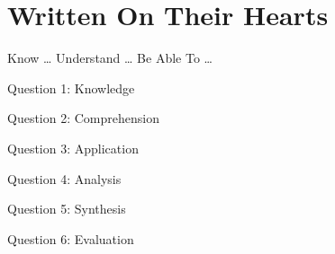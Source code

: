 \chapter{Written On Their Hearts}

\begin{goals}
\goal Know \ldots
\goal Understand \ldots
\goal Be Able To \ldots
\end{goals}

\intro

\lipsum[4]

\bible

\begin{quote}
\lipsum[4] 
\end{quote}

\begin{quote}
\lipsum[4] 
\end{quote}

\begin{quote}
\lipsum[4] 
\end{quote}

\begin{quote}
\lipsum[4] 
\end{quote}

\discussion

\lipsum[5-7]

\questions

Question 1: Knowledge
\vfill

Question 2: Comprehension
\vfill

Question 3: Application
\vfill

Question 4: Analysis
\vfill

Question 5: Synthesis
\vfill

Question 6: Evaluation
\vfill